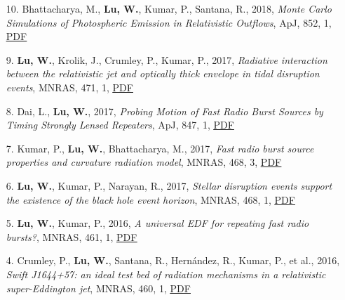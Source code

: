 \begin{itemize}[leftmargin=0.65cm]
\vspace{-0.1cm}
\item[10.]{Bhattacharya, M., {\bf Lu, W.}, Kumar, P., Santana, R., 2018, {\it Monte Carlo Simulations of Photospheric Emission in Relativistic Outflows}, ApJ, 852, 1, \href{https://ui.adsabs.harvard.edu/abs/2018ApJ...852...24B}{\underline{PDF}}}

\vspace{-0.1cm}
\item[9.]{{\bf Lu, W.}, Krolik, J., Crumley, P., Kumar, P., 2017, {\it Radiative interaction between the relativistic jet and optically thick envelope in tidal disruption events}, MNRAS, 471, 1, \href{https://ui.adsabs.harvard.edu/abs/2017MNRAS.471.1141L}{\underline{PDF}}}

\vspace{-0.1cm}
\item[8.]{Dai, L., {\bf Lu, W.}, 2017, {\it Probing Motion of Fast Radio Burst Sources by Timing Strongly Lensed Repeaters}, ApJ, 847, 1, \href{https://ui.adsabs.harvard.edu/abs/2017ApJ...847...19D}{\underline{PDF}}}

\vspace{-0.1cm}
\item[7.]{Kumar, P., {\bf Lu, W.}, Bhattacharya, M., 2017, {\it Fast radio burst source properties and curvature radiation model}, MNRAS, 468, 3, \href{https://ui.adsabs.harvard.edu/abs/2017MNRAS.468.2726K}{\underline{PDF}}}

\vspace{-0.1cm}
\item[6.]{{\bf Lu, W.}, Kumar, P., Narayan, R., 2017, {\it Stellar disruption events support the existence of the black hole event horizon}, MNRAS, 468, 1, \href{https://ui.adsabs.harvard.edu/abs/2017MNRAS.468..910L}{\underline{PDF}}}

\vspace{-0.1cm}
\item[5.]{{\bf Lu, W.}, Kumar, P., 2016, {\it A universal EDF for repeating fast radio bursts?}, MNRAS, 461, 1, \href{https://ui.adsabs.harvard.edu/abs/2016MNRAS.461L.122L}{\underline{PDF}}}

\vspace{-0.1cm}
\item[4.]{Crumley, P., {\bf Lu, W.}, Santana, R., Hern{\'a}ndez, R., Kumar, P., et al., 2016, {\it Swift J1644+57: an ideal test bed of radiation mechanisms in a relativistic super-Eddington jet}, MNRAS, 460, 1, \href{https://ui.adsabs.harvard.edu/abs/2016MNRAS.460..396C}{\underline{PDF}}}


\end{itemize}
